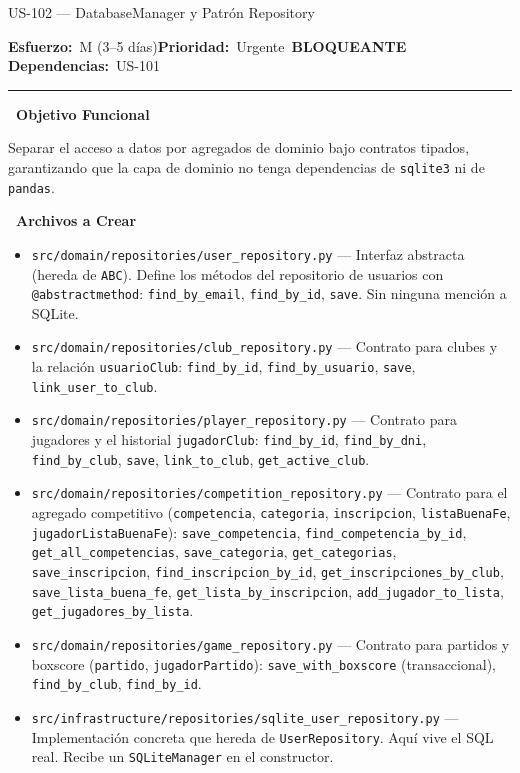 \documentclass[11pt,a4paper]{article}
\newcommand{\fpath}[1]{\texttt{\small #1}}
\newcommand{\usfield}[2][\;]{%
  \par\vspace{5pt}%
  {\small\textbf{\textcolor{primary}{#2}}}\par\vspace{2pt}%
}
\newcommand{\usmeta}[3]{%
  \vspace{2pt}%
  {\small\textcolor{secondary}{%
    \textbf{Esfuerzo:}~#1\quad\textbf{Prioridad:}~#2\quad\textbf{Dependencias:}~#3%
  }}%
  \par\vspace{4pt}%
  \textcolor{bordergray}{\rule{\linewidth}{0.4pt}}\par\vspace{4pt}%
}
\newcommand{\tagblocking}{\,\colorbox{tagblue}{\tiny\bfseries BLOQUEANTE}\,}
\begin{document}
\begin{uscard}{US-102 — DatabaseManager y Patrón Repository}

\usmeta{M (3–5 días)}{Urgente \tagblocking}{US-101}

\usfield{\faAlignLeft\ Objetivo Funcional}
Separar el acceso a datos por agregados de dominio bajo contratos tipados, garantizando que la capa de dominio no tenga dependencias de \fpath{sqlite3} ni de \fpath{pandas}.

\usfield{\faFolderOpen\ Archivos a Crear}
\begin{itemize}[nosep, leftmargin=1.6em]
  \item \fpath{src/domain/repositories/user\_repository.py} — Interfaz abstracta (hereda de \fpath{ABC}). Define los métodos del repositorio de usuarios con \fpath{@abstractmethod}: \fpath{find\_by\_email}, \fpath{find\_by\_id}, \fpath{save}. Sin ninguna mención a SQLite.
  \item \fpath{src/domain/repositories/club\_repository.py} — Contrato para clubes y la relación \fpath{usuarioClub}: \fpath{find\_by\_id}, \fpath{find\_by\_usuario}, \fpath{save}, \fpath{link\_user\_to\_club}.
  \item \fpath{src/domain/repositories/player\_repository.py} — Contrato para jugadores y el historial \fpath{jugadorClub}: \fpath{find\_by\_id}, \fpath{find\_by\_dni}, \fpath{find\_by\_club}, \fpath{save}, \fpath{link\_to\_club}, \fpath{get\_active\_club}.
  \item \fpath{src/domain/repositories/competition\_repository.py} — Contrato para el agregado competitivo (\fpath{competencia}, \fpath{categoria}, \fpath{inscripcion}, \fpath{listaBuenaFe}, \fpath{jugadorListaBuenaFe}): \fpath{save\_competencia}, \fpath{find\_competencia\_by\_id}, \fpath{get\_all\_competencias}, \fpath{save\_categoria}, \fpath{get\_categorias}, \fpath{save\_inscripcion}, \fpath{find\_inscripcion\_by\_id}, \fpath{get\_inscripciones\_by\_club}, \fpath{save\_lista\_buena\_fe}, \fpath{get\_lista\_by\_inscripcion}, \fpath{add\_jugador\_to\_lista}, \fpath{get\_jugadores\_by\_lista}.
  \item \fpath{src/domain/repositories/game\_repository.py} — Contrato para partidos y boxscore (\fpath{partido}, \fpath{jugadorPartido}): \fpath{save\_with\_boxscore} (transaccional), \fpath{find\_by\_club}, \fpath{find\_by\_id}.
  \item \fpath{src/infrastructure/repositories/sqlite\_user\_repository.py} — Implementación concreta que hereda de \fpath{UserRepository}. Aquí vive el SQL real. Recibe un \fpath{SQLiteManager} en el constructor.

\end{itemize}
\end{uscard}
\end{document}
